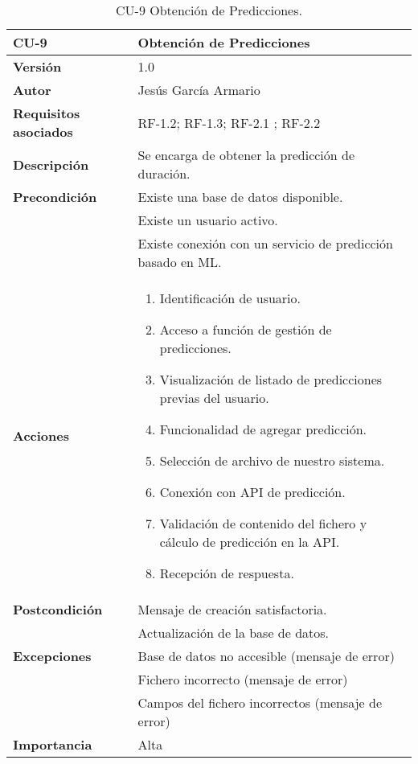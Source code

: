 \begin{table}[p]
	\centering
	\begin{tabularx}{\linewidth}{ p{} p{} }
		\toprule
		\textbf{CU-9}    & \textbf{Obtención de Predicciones}\\
		\toprule
		\textbf{Versión}              & 1.0    \\
		\textbf{Autor}                & Jesús García Armario \\
		\textbf{Requisitos asociados} & RF-1.2; RF-1.3; RF-2.1 ; RF-2.2 \\
		\textbf{Descripción}          & Se encarga de obtener la predicción de duración. \\
		\textbf{Precondición}         & Existe una base de datos disponible. \\
  & Existe un usuario activo.\\
  & Existe conexión con un servicio de predicción basado en ML.\\
		\textbf{Acciones}             &
		\begin{enumerate}
			\def\labelenumi{\arabic{enumi}.}
			\tightlist
			\item Identificación de usuario.
   \item Acceso a función de gestión de predicciones.
   \item Visualización de listado de predicciones previas del usuario.
   \item Funcionalidad de agregar predicción.
   \item Selección de archivo de nuestro sistema.
   \item Conexión con API de predicción.
   \item Validación de contenido del fichero y cálculo de predicción en la API.
   \item Recepción de respuesta.
\end{enumerate}\\
		\textbf{Postcondición}        &  Mensaje de creación satisfactoria. \\
  & Actualización de la base de datos.\\
		\textbf{Excepciones}          & Base de datos no accesible (mensaje de error)\\
  & Fichero incorrecto (mensaje de error)\\
  & Campos del fichero incorrectos (mensaje de error)\\
		\textbf{Importancia}          & Alta \\
		\bottomrule
	\end{tabularx}
	\caption{CU-9 Obtención de Predicciones.}
 \end{table}

